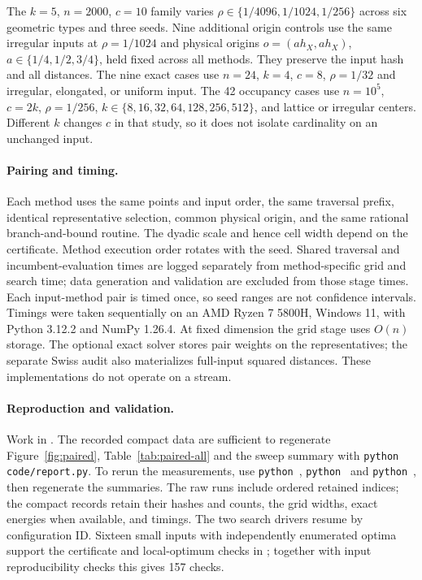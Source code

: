 \documentclass[a4paper,12pt]{article}
\numberwithin{equation}{section}
\begin{document}
The $k=5$, $n=2000$, $c=10$ family varies $\rho\in\{1/4096,1/1024,1/256\}$ across six geometric
types and three seeds. Nine additional origin controls use the same irregular inputs at
$\rho=1/1024$ and physical origins $o=(a h_X,a h_X)$, $a\in\{1/4,1/2,3/4\}$, held fixed across all
methods. They preserve the input hash and all distances. The nine exact cases use $n=24$, $k=4$,
$c=8$, $\rho=1/32$ and irregular, elongated, or uniform input. The 42 occupancy cases use
$n=10^5$, $c=2k$, $\rho=1/256$, $k\in\{8,16,32,64,128,256,512\}$, and lattice or irregular
centers. Different $k$ changes $c$ in that study, so it does not isolate cardinality on an
unchanged input.

\paragraph{Pairing and timing.}
Each method uses the same points and input order, the same traversal prefix, identical
representative selection, common physical origin, and the same rational branch-and-bound routine.
The dyadic scale and hence cell width depend on the certificate. Method execution order rotates
with the seed. Shared traversal and incumbent-evaluation times are logged separately from
method-specific grid and search time; data generation and validation are excluded from those stage
times. Each input-method pair is timed once, so seed ranges are not confidence intervals. Timings
were taken sequentially on an AMD Ryzen 7 5800H, Windows 11, with Python 3.12.2 and NumPy 1.26.4.
At fixed dimension the grid stage uses $O(n)$ storage. The optional exact solver stores pair
weights on the representatives; the separate Swiss audit also materializes full-input squared
distances. These implementations do not operate on a stream.

\paragraph{Reproduction and validation.}
Work in . The recorded compact data are sufficient to regenerate
Figure~\ref{fig:paired}, Table~\ref{tab:paired-all} and the sweep summary with \verb|python code/report.py|. To rerun the measurements, use \texttt{python}\ ,
\texttt{python}\  and \texttt{python}\ , then
regenerate the summaries. The raw runs include ordered retained indices; the compact records
retain their hashes and counts, the grid widths, exact energies when available, and timings. The
two search drivers resume by configuration ID. Sixteen small inputs with independently enumerated
optima support the certificate and local-optimum checks in ; together with
input reproducibility checks this gives 157 checks.
\end{document}
